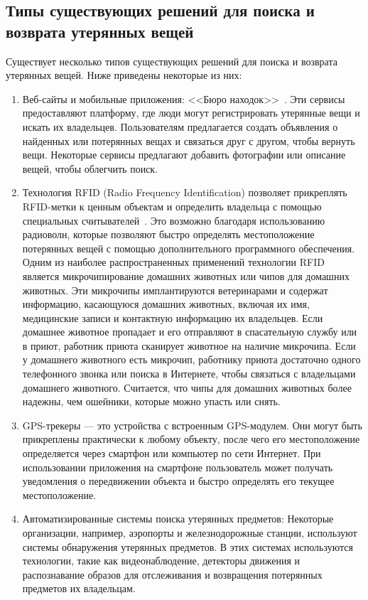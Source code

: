 \documentclass{mirea-article}
\begin{document}
	\subsection*{Типы существующих решений для поиска и возврата утерянных вещей}
	
	Существует несколько типов существующих решений для поиска и возврата утерянных вещей. Ниже приведены некоторые из них:
	\begin{enumerate}
		\item Веб-сайты и мобильные приложения: <<Бюро находок>>~\cite{bib:stol_nahodok,bib:pona}. Эти сервисы предоставляют платформу, где люди могут регистрировать утерянные вещи и искать их владельцев. Пользователям предлагается создать объявления о найденных или потерянных вещах и связаться друг с другом, чтобы вернуть вещи. Некоторые сервисы предлагают добавить фотографии или описание вещей, чтобы облегчить поиск. 
		
		\item Технология RFID (Radio Frequency Identification) позволяет прикреплять RFID-метки к ценным объектам и определить владельца с помощью специальных считывателей~\cite{bib:investopedia_rfid,bib:airtag}. Это возможно благодаря использованию радиоволн, которые позволяют быстро определять местоположение потерянных вещей с помощью дополнительного программного обеспечения. Одним из наиболее распространенных применений технологии RFID является микрочипирование домашних животных или чипов для домашних животных. Эти микрочипы имплантируются ветеринарами и содержат информацию, касающуюся домашних животных, включая их имя, медицинские записи и контактную информацию их владельцев. Если домашнее животное пропадает и его отправляют в спасательную службу или в приют, работник приюта сканирует животное на наличие микрочипа. Если у домашнего животного есть микрочип, работнику приюта достаточно одного телефонного звонка или поиска в Интернете, чтобы связаться с владельцами домашнего животного. Считается, что чипы для домашних животных более надежны, чем ошейники, которые можно упасть или снять.
		
		\item GPS-трекеры --- это устройства с встроенным GPS-модулем. Они могут быть прикреплены практически к любому объекту, после чего его местоположение определяется через смартфон или компьютер по сети Интернет. При использовании приложения на смартфоне пользователь может получать уведомления о передвижении объекта и быстро определять его текущее местоположение.
		
		\item Автоматизированные системы поиска утерянных предметов: Некоторые организации, например, аэропорты и железнодорожные станции, используют системы обнаружения утерянных предметов. В этих системах используются технологии, такие как видеонаблюдение, детекторы движения и распознавание образов для отслеживания и возвращения потерянных предметов их владельцам.
	\end{enumerate}
	
\end{document}
